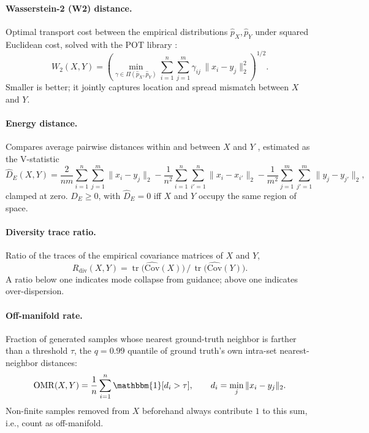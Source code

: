 \documentclass{article}
\begin{document}
\paragraph{Wasserstein-2 (W2) distance.} Optimal transport cost between the empirical distributions $\hat{p}_X, \hat{p}_Y$ under squared Euclidean cost, solved with the POT library \citep{peyre2019computational}:
\begin{equation}
    W_2(X, Y) = \left( \min_{\gamma \in \Pi(\hat{p}_X, \hat{p}_Y)} \sum_{i=1}^n \sum_{j=1}^m \gamma_{ij} \, \|x_i - y_j\|_2^2 \right)^{1/2}.
    \label{eq:w2_metric}
\end{equation}
Smaller is better; it jointly captures location and spread mismatch between $X$ and $Y$.

\paragraph{Energy distance.} Compares average pairwise distances within and between $X$ and $Y$ \citep{szekely2013energy}, estimated as the V-statistic
\begin{equation}
    \hat{D}_E(X, Y) = \frac{2}{nm}\sum_{i=1}^n \sum_{j=1}^m \|x_i - y_j\|_2 - \frac{1}{n^2}\sum_{i=1}^n \sum_{i'=1}^n \|x_i - x_{i'}\|_2 - \frac{1}{m^2}\sum_{j=1}^m \sum_{j'=1}^m \|y_j - y_{j'}\|_2,
    \label{eq:energy_metric}
\end{equation}
clamped at zero. $\hat{D}_E \geq 0$, with $\hat{D}_E = 0$ iff $X$ and $Y$ occupy the same region of space.

\paragraph{Diversity trace ratio.} Ratio of the traces of the empirical covariance matrices of $X$ and $Y$,
\begin{equation}
    R_{\mathrm{div}}(X, Y) = \operatorname{tr}\bigl(\widehat{\mathrm{Cov}}(X)\bigr) \,/\, \operatorname{tr}\bigl(\widehat{\mathrm{Cov}}(Y)\bigr).
    \label{eq:diversity_metric}
\end{equation}
A ratio below one indicates mode collapse from guidance; above one indicates over-dispersion.

\paragraph{Off-manifold rate.} Fraction of generated samples whose nearest ground-truth neighbor is farther than a threshold $\tau$, the $q{=}0.99$ quantile of ground truth's own intra-set nearest-neighbor distances:
\begin{equation}
    \mathrm{OMR}(X, Y) = \frac{1}{n}\sum_{i=1}^n \mathbbm{1}[d_i > \tau], \qquad d_i = \min_{j} \|x_i - y_j\|_2.
    \label{eq:off_manifold_metric}
\end{equation}
Non-finite samples removed from $X$ beforehand always contribute $1$ to this sum, i.e., count as off-manifold.
\end{document}
